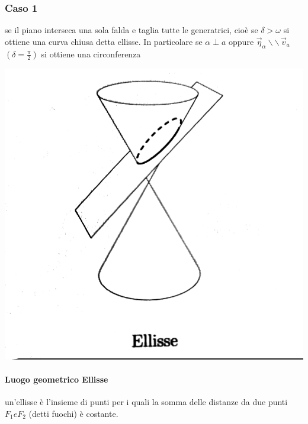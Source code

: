 \documentclass[a4paper,11pt]{article}
\begin{document}
\subsubsection{Caso 1}
se il piano interseca una sola falda e taglia tutte le generatrici, cioè se \( \delta > \omega \) si ottiene una curva chiusa detta ellisse. 
In particolare se \( \alpha \perp a \) oppure \( \vec{\eta}_\alpha \backslash \backslash \, \vec{v}_a \)   \( (\delta = \frac{\pi}{2}) \) si ottiene una circonferenza
\begin{center}
\begin{minipage}{8cm}
    \includegraphics[scale=0.3]{ellisse.png}
\end{minipage}
\end{center}
\paragraph{Luogo geometrico Ellisse}
un'ellisse è l'insieme di punti per i quali la somma delle distanze da due punti \(F_1 e F_2\) (detti fuochi) è costante.
\end{document}
